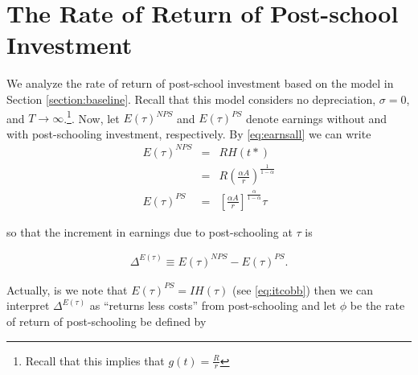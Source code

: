 \section{The Rate of Return of Post-school Investment}
We analyze the rate of return of post-school investment based on the model in Section \ref{section:baseline}. Recall that this model considers no depreciation, $\sigma = 0$, and $T \rightarrow \infty$.\footnote{Recall that this implies that $g(t) = \frac{R}{r}$}. Now, let $E(\tau)^{NPS}$ and $E(\tau)^{PS}$ denote earnings without and with post-schooling investment, respectively. By \eqref{eq:earnsall} we can write
\begin{eqnarray}
E(\tau)^{NPS} &=& R H(t*) \\ \nonumber
&=& R \left( \frac{\alpha A}{r} \right)^{\frac{1}{1 - \alpha}} \\ \nonumber
E(\tau)^{PS} &=& \left[ \frac{\alpha A}{r} \right]^{\frac{\alpha}{1-\alpha}} \tau
\end{eqnarray}

\noindent so that the increment in earnings due to post-schooling at $\tau$ is

\begin{eqnarray}
\Delta^{E(\tau)} \equiv E(\tau)^{NPS} - E(\tau)^{PS}.
\end{eqnarray}

\indent Actually, is we note that $E(\tau)^{PS} = IH(\tau)$ (see \eqref{eq:itcobb}) then we can interpret $\Delta^{E(\tau)}$ as ``returns less costs'' from post-schooling and let $\phi$ be the rate of return of post-schooling be defined by